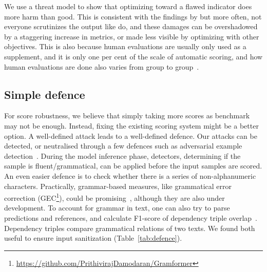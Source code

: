 \documentclass[11pt]{article}
\theoremstyle{remark}
\begin{document}
We use a threat model to show that optimizing toward a flawed indicator does more harm than good. This is consistent with the findings by \citeauthor{paulus2018a} but more often, not everyone scrutinizes the output like \citeauthor{paulus2018a} do, and these damages can be overshadowed by a staggering increase in metrics, or made less visible by optimizing with other objectives. This is also because human evaluations are usually only used as a supplement, and it is only one per cent of the scale of automatic scoring, and how human evaluations are done also varies from group to group~\cite{van2021human}. 


\subsection{Simple defence}
For score robustness, we believe that simply taking more scores as benchmark~\cite{gehrmann-etal-2021-gem} may not be enough. Instead, fixing the existing scoring system might be a better option. A well-defined attack leads to a well-defined defence. Our attacks can be detected, or neutralised through a few defences such as adversarial example detection~\cite{xu2017feature,metzen2017detecting,carlini2017adversarial}. During the model inference phase, detectors, determining if the sample is fluent/grammatical, can be applied before the input samples are scored. An even easier defence is to check whether there is a series of non-alphanumeric characters. Practically, grammar-based measures, like grammatical error correction (GEC\footnote{\url{https://github.com/PrithivirajDamodaran/Gramformer}}), could be promising~\cite{napoles-etal-2016-theres,novikova-etal-2017-need}, although they are also under development. To account for grammar in text, one can also try to parse predictions and references, and calculate F1-score of dependency triple overlap~\cite{riezler-etal-2003-statistical,clarke-lapata-2006-models}. Dependency triples compare grammatical relations of two texts. We found both useful to ensure input sanitization (Table~\ref{tab:defence}).
\end{document}
